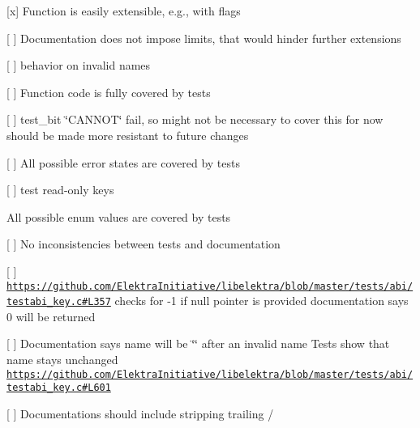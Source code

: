 {\ttfamily }

{\ttfamily 
\begin{DoxyItemize}
\item \mbox{[}x\mbox{]} Function is easily extensible, e.\+g., with flags
\item \mbox{[} \mbox{]} Documentation does not impose limits, that would hinder further extensions
\begin{DoxyItemize}
\item \mbox{[} \mbox{]} behavior on invalid names
\end{DoxyItemize}
\end{DoxyItemize}}

{\ttfamily }

{\ttfamily 
\begin{DoxyItemize}
\item \mbox{[} \mbox{]} Function code is fully covered by tests
\begin{DoxyItemize}
\item \mbox{[} \mbox{]} test\+\_\+bit \char`\"{}\+C\+A\+N\+N\+O\+T\char`\"{} fail, so might not be necessary to cover this for now should be made more resistant to future changes
\end{DoxyItemize}
\item \mbox{[} \mbox{]} All possible error states are covered by tests
\begin{DoxyItemize}
\item \mbox{[} \mbox{]} test read-\/only keys
\end{DoxyItemize}
\item All possible enum values are covered by tests
\item \mbox{[} \mbox{]} No inconsistencies between tests and documentation
\begin{DoxyItemize}
\item \mbox{[} \mbox{]} \href{https://github.com/ElektraInitiative/libelektra/blob/master/tests/abi/testabi_key.c#L357}{\tt https\+://github.\+com/\+Elektra\+Initiative/libelektra/blob/master/tests/abi/testabi\+\_\+key.\+c\#\+L357} checks for -\/1 if null pointer is provided documentation says 0 will be returned
\item \mbox{[} \mbox{]} Documentation says name will be {\ttfamily \char`\"{}\char`\"{}} after an invalid name Tests show that name stays unchanged \href{https://github.com/ElektraInitiative/libelektra/blob/master/tests/abi/testabi_key.c#L601}{\tt https\+://github.\+com/\+Elektra\+Initiative/libelektra/blob/master/tests/abi/testabi\+\_\+key.\+c\#\+L601}
\item \mbox{[} \mbox{]} Documentations should include stripping trailing {\ttfamily /}
\end{DoxyItemize}
\end{DoxyItemize}}

{\ttfamily }

{\ttfamily  }

{\ttfamily }